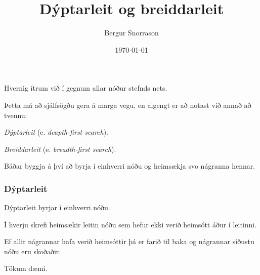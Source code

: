 \title{Dýptarleit og breiddarleit}
\author{Bergur Snorrason}
\date{\today}



\frame{\titlepage}

{
	{
		\item<1-> Hvernig ítrum við í gegnum allar nóður stefnds nets.
		\item<2-> Þetta má að sjálfsögðu gera á marga vegu, en algengt er að notast við annað að tvennu:
		{
			\item<3-> \emph{Dýptarleit} (e. \emph{deapth-first search}).
			\item<4-> \emph{Breiddarleit} (e. \emph{breadth-first search}).
		}
		\item<5-> Báðar byggja á því að byrja í einhverri nóðu og heimsækja svo nágranna hennar.
	}
}

{
	\frametitle{Dýptarleit}
	{
		\item<1-> Dýptarleit byrjar í einhverri nóðu.
		\item<2-> Í hverju skrefi heimsækir leitin nóðu sem hefur ekki verið heimsótt áður í leitinni.
		\item<3-> Ef allir nágrannar hafa verið heimsóttir þá er farið til baka og nágrannar síðustu nóðu eru skoðaðir.
		\item<4-> Tökum dæmi.
	}
}

